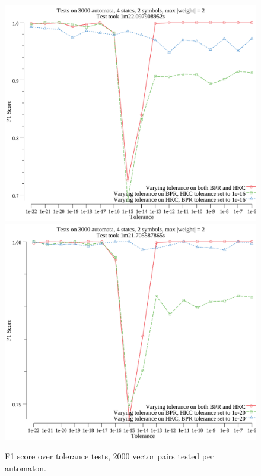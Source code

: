 \begin{figure}[htbp!]
    \centering
    \includegraphics[width=.75\textwidth]{./plots/f1-tol-1e-16.pdf}
    \includegraphics[width=.75\textwidth]{./plots/f1-tol-1e-20.pdf}
    \caption{F1 score over tolerance tests, 2000 vector pairs tested per automaton.}
    \label{fig:f1-2}
\end{figure}


